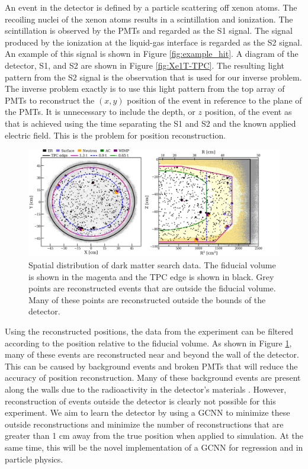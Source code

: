 \documentclass[thesis.tex]{subfiles}
\begin{document}
\par An event in the detector is defined by a particle scattering off xenon atoms.
The recoiling nuclei of the xenon atoms results in a scintillation and ionization.
The scintillation is observed by the PMTs and regarded as the S1 signal.
The signal produced by the ionization at the liquid-gas interface is regarded as the S2 signal.
An example of this signal is shown in Figure \ref{fig:example_hit}.
A diagram of the detector, S1, and S2 are shown in Figure \ref{fig:Xe1T-TPC}.
The resulting light pattern from the S2 signal is the observation that is used for our inverse problem.
The inverse problem exactly is to use this light pattern from the top array of PMTs to reconstruct the $(x, y)$ position of the event in reference to the plane of the PMTs.
It is unnecessary to include the depth, or $z$ position, of the event as that is achieved using the time separating the S1 and S2 and the known applied electric field.
This is the problem for position reconstruction.

\begin{figure}[t]
	\centering
	\includegraphics[width=\linewidth]{figures/reconstruction_distribution.png}
	\caption{
	Spatial distribution of dark matter search data.
	The fiducial volume is shown in the magenta and the TPC edge is shown in black.
	Grey points are reconstructed events that are outside the fiducial volume.
	Many of these points are reconstructed outside the bounds of the detector.
	\cite{Xe1T-YearExpo}
	}
	\label{fig:reco-distro}
\end{figure}
\par Using the reconstructed positions, the data from the experiment can be filtered according to the position relative to the fiducial volume.
As shown in Figure \ref{fig:reco-distro}, many of these events are reconstructed near and beyond the wall of the detector.
This can be caused by background events and broken PMTs that will reduce the accuracy of position reconstruction.
Many of these background events are present along the walls due to the radioactivity in the detector's materials \cite{Xe1T-YearExpo}.
However, reconstruction of events outside the detector is clearly not possible for this experiment.
We aim to learn the detector by using a GCNN to minimize these outside reconstructions and minimize the number of reconstructions that are greater than 1 cm away from the true position when applied to simulation.
At the same time, this will be the novel implementation of a GCNN for regression and in particle physics.
\end{document}
